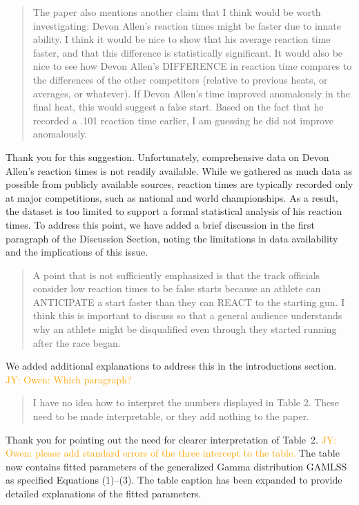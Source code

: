 \documentclass[12pt]{article}
\newcommand{\jy}[1]{\textcolor{orange}{JY: #1}}
\newenvironment{comment}%
{\begin{quotation}\noindent\small\it\color{darkblue}\ignorespaces%
}{\end{quotation}}
\begin{document}
\begin{comment}
The paper also mentions another claim that I think would be worth investigating:
Devon Allen’s reaction times might be faster due to innate ability. I think it
would be nice to show that his average reaction time faster, and that this
difference is statistically significant. It would also be nice to see how Devon
Allen’s DIFFERENCE in reaction time compares to the differences of the other
competitors (relative to previous heats, or averages, or whatever). If Devon
Allen’s time improved anomalously in the final heat, this would suggest a false
start. Based on the fact that he recorded a .101 reaction time earlier, I am
guessing he did not improve anomalously.
\end{comment}


Thank you for this suggestion. Unfortunately, comprehensive data on 
Devon Allen’s reaction times is not readily available. While we gathered 
as much data as possible from publicly available sources, reaction times 
are typically recorded only at major competitions, such as national and 
world championships. As a result, the dataset is too limited to support 
a formal statistical analysis of his reaction times.
To address this point, we have added a brief discussion in the first 
paragraph of the Discussion Section, noting the limitations in data 
availability and the implications of this issue.


\begin{comment}
A point that is not sufficiently emphasized is that the track officials consider
low reaction times to be false starts because an athlete can ANTICIPATE a start
faster than they can REACT to the starting gun. I think this is important to
discuss so that a general audience understands why an athlete might be
disqualified even through they started running after the race began.
\end{comment}

We added additional explanations to address this in the introductions section.
\jy{Owen: Which paragraph?}

\begin{comment}
I have no idea how to interpret the numbers displayed in Table 2. These
need to be made interpretable, or they add nothing to the paper.
\end{comment}

Thank you for pointing out the need for clearer interpretation of
Table~2.
\jy{Owen: please add standard errors of the three intercept  to the table.}
The table now contains fitted parameters of the generalized Gamma
distribution GAMLSS as specified Equations (1)--(3). The table caption has been
expanded to provide detailed explanations of the fitted parameters.
\end{document}
